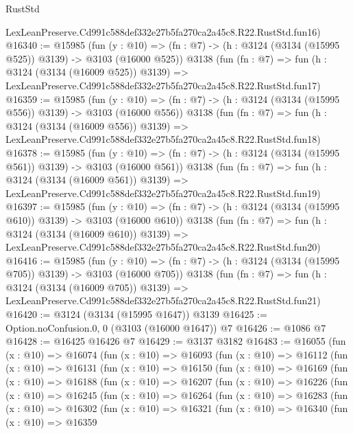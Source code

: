 \begin{lexlean}{RustStd}
\begin{coremodule}
    LexLeanPreserve.Cd991c588def332e27b5fa270ca2a45c8.R22.RustStd.fun16)
@16340 := @15985
    (fun (y : @10) => (fn : @7) -> (h : @3124 (@3134 (@15995 @525)) @3139) -> @3103 (@16000 @525))
    @3138
    (fun (fn : @7) =>
    fun (h : @3124 (@3134 (@16009 @525)) @3139) =>
    LexLeanPreserve.Cd991c588def332e27b5fa270ca2a45c8.R22.RustStd.fun17)
@16359 := @15985
    (fun (y : @10) => (fn : @7) -> (h : @3124 (@3134 (@15995 @556)) @3139) -> @3103 (@16000 @556))
    @3138
    (fun (fn : @7) =>
    fun (h : @3124 (@3134 (@16009 @556)) @3139) =>
    LexLeanPreserve.Cd991c588def332e27b5fa270ca2a45c8.R22.RustStd.fun18)
@16378 := @15985
    (fun (y : @10) => (fn : @7) -> (h : @3124 (@3134 (@15995 @561)) @3139) -> @3103 (@16000 @561))
    @3138
    (fun (fn : @7) =>
    fun (h : @3124 (@3134 (@16009 @561)) @3139) =>
    LexLeanPreserve.Cd991c588def332e27b5fa270ca2a45c8.R22.RustStd.fun19)
@16397 := @15985
    (fun (y : @10) => (fn : @7) -> (h : @3124 (@3134 (@15995 @610)) @3139) -> @3103 (@16000 @610))
    @3138
    (fun (fn : @7) =>
    fun (h : @3124 (@3134 (@16009 @610)) @3139) =>
    LexLeanPreserve.Cd991c588def332e27b5fa270ca2a45c8.R22.RustStd.fun20)
@16416 := @15985
    (fun (y : @10) => (fn : @7) -> (h : @3124 (@3134 (@15995 @705)) @3139) -> @3103 (@16000 @705))
    @3138
    (fun (fn : @7) =>
    fun (h : @3124 (@3134 (@16009 @705)) @3139) =>
    LexLeanPreserve.Cd991c588def332e27b5fa270ca2a45c8.R22.RustStd.fun21)
@16420 := @3124 (@3134 (@15995 @1647)) @3139
@16425 := Option.noConfusion.{0, 0} (@3103 (@16000 @1647)) @7
@16426 := @1086 @7
@16428 := @16425 @16426 @7
@16429 := @3137 @3182
@16483 := @16055
    (fun (x : @10) =>
    @16074
      (fun (x : @10) =>
      @16093
        (fun (x : @10) =>
        @16112
          (fun (x : @10) =>
          @16131
            (fun (x : @10) =>
            @16150
              (fun (x : @10) =>
              @16169
                (fun (x : @10) =>
                @16188
                  (fun (x : @10) =>
                  @16207
                    (fun (x : @10) =>
                    @16226
                      (fun (x : @10) =>
                      @16245
                        (fun (x : @10) =>
                        @16264
                          (fun (x : @10) =>
                          @16283
                            (fun (x : @10) =>
                            @16302
                              (fun (x : @10) =>
                              @16321
                                (fun (x : @10) =>
                                @16340
                                  (fun (x : @10) =>
                                  @16359

\end{coremodule}
\end{lexlean}

